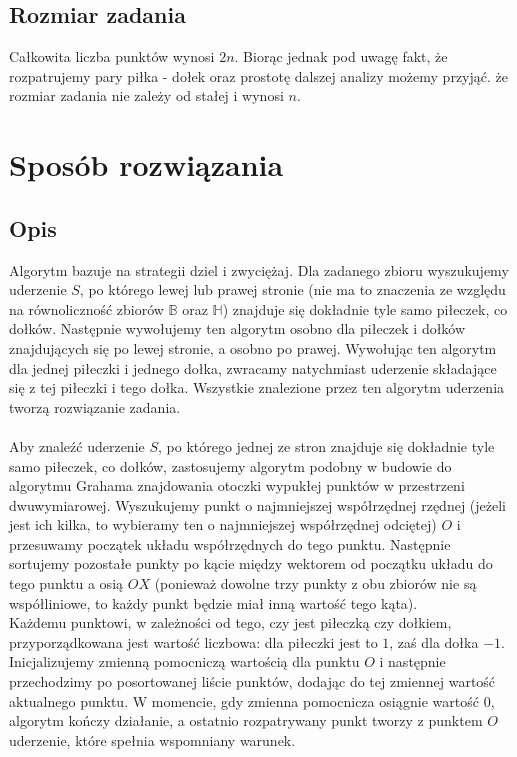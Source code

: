 \documentclass[10pt,a4paper]{article}
\begin{document}
	\subsection{Rozmiar zadania}
	
	Całkowita liczba punktów wynosi $2n$. Biorąc jednak pod uwagę fakt, że rozpatrujemy pary piłka - dołek oraz prostotę dalszej analizy możemy przyjąć. że rozmiar zadania nie zależy od stałej i wynosi $n$.
	
	\section{Sposób rozwiązania}
	
	\subsection{Opis}
	
	Algorytm bazuje na strategii dziel i zwyciężaj. Dla zadanego zbioru wyszukujemy uderzenie $S$, po którego lewej lub prawej stronie (nie ma to znaczenia ze względu na równoliczność zbiorów $\mathbb{B}$ oraz $\mathbb{H}$) znajduje się dokładnie tyle samo piłeczek, co dołków. Następnie wywołujemy ten algorytm osobno dla piłeczek i dołków znajdujących się po lewej stronie, a osobno po prawej. Wywołując ten algorytm dla jednej piłeczki i jednego dołka, zwracamy natychmiast uderzenie składające się z tej piłeczki i tego dołka. Wszystkie znalezione przez ten algorytm uderzenia tworzą rozwiązanie zadania. \\~\\
	Aby znaleźć uderzenie $S$, po którego jednej ze stron znajduje się dokładnie tyle samo piłeczek, co dołków, zastosujemy algorytm podobny w budowie do algorytmu Grahama znajdowania otoczki wypukłej punktów w przestrzeni dwuwymiarowej. Wyszukujemy punkt o najmniejszej współrzędnej rzędnej (jeżeli jest ich kilka, to wybieramy ten o najmniejszej współrzędnej odciętej) $O$ i przesuwamy początek układu współrzędnych do tego punktu. Następnie sortujemy pozostałe punkty po kącie między wektorem od początku układu do tego punktu a osią $OX$ (ponieważ dowolne trzy punkty z obu zbiorów nie są współliniowe, to każdy punkt będzie miał inną wartość tego kąta). \\
	Każdemu punktowi, w zależności od tego, czy jest piłeczką czy dołkiem, przyporządkowana jest wartość liczbowa: dla piłeczki jest to $1$, zaś dla dołka $-1$. Inicjalizujemy zmienną pomocniczą wartością dla punktu $O$ i następnie przechodzimy po posortowanej liście punktów, dodając do tej zmiennej wartość aktualnego punktu. W momencie, gdy zmienna pomocnicza osiągnie wartość $0$, algorytm kończy działanie, a ostatnio rozpatrywany punkt tworzy z punktem $O$ uderzenie, które spełnia wspomniany warunek.
	
\end{document}
